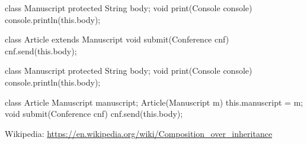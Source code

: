\documentclass{article}
\begin{document}
\begin{multicols}{2}
{\small\begin{ffcode}
class Manuscript
  protected String body;
  void print(Console console)
    console.println(this.body);

class Article
  extends Manuscript
  void submit(Conference cnf)
    cnf.send(this.body);
\end{ffcode}
}
\par\columnbreak\par
{\small\begin{ffcode}
class Manuscript
  protected String body;
  void print(Console console)
    console.println(this.body);

class Article
  Manuscript manuscript;
  Article(Manuscript m)
    this.manuscript = m;
  void submit(Conference cnf)
    cnf.send(this.body);
\end{ffcode}
}
\end{multicols}\par
{\scriptsize Wikipedia: \url{https://en.wikipedia.org/wiki/Composition_over_inheritance}\par}
\plush{}


\end{document}
